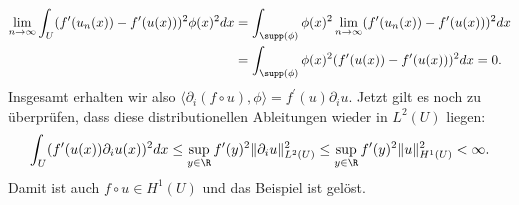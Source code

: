 \begin{solution}
\begin{align*}
  \lim_{n \to \infty}\int_U (f^{\prime}(u_n(x)) - f^{\prime}(u(x)))^2\phi(x)^2 dx
  &= \int_{\supp(\phi)} \phi(x)^2\lim_{n \to \infty}(f^{\prime}(u_n(x)) - f^{\prime}(u(x)))^2 dx \\
  &= \int_{\supp(\phi)}\phi(x)^2(f^{\prime}(u(x)) - f^{\prime}(u(x)))^2 dx = 0.
\end{align*}
Insgesamt erhalten wir also $\langle \partial_i (f \circ u), \phi \rangle = f^{\prime}(u)\partial_i u$.
Jetzt gilt es noch zu überprüfen, dass diese distributionellen Ableitungen wieder
in $L^2(U)$ liegen:
\begin{align*}
  \int_{U}(f^{\prime}(u(x))\partial_i u(x))^2 dx
  \leq \sup_{y \in \R}f^{\prime}(y)^2\|\partial_i u\|_{L^2(U)}^2
  \leq \sup_{y \in \R}f^{\prime}(y)^2\|u\|_{H^1(U)}^2 < \infty.
\end{align*}
Damit ist auch $f \circ u \in H^1(U)$ und das Beispiel ist gelöst.
\end{solution}

